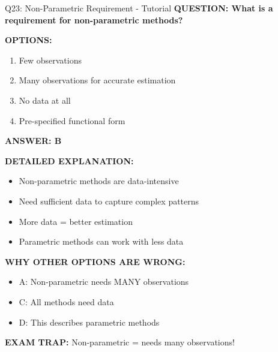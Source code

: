 \documentclass[8pt]{beamer}
\begin{document}
	\begin{frame}{Q23: Non-Parametric Requirement - Tutorial}
		\fontsize{6.5}{7.5}\selectfont
		\textbf{QUESTION: What is a requirement for non-parametric methods?}
		
		\vspace{0.1cm}
		\textbf{OPTIONS:}
		\begin{enumerate}
			\item Few observations
			\item Many observations for accurate estimation
			\item No data at all
			\item Pre-specified functional form
		\end{enumerate}
		
		\vspace{0.1cm}
		\textcolor{myblue}{\textbf{ANSWER: B}}
		
		\vspace{0.1cm}
		\textbf{DETAILED EXPLANATION:}
		\begin{itemize}
			\item Non-parametric methods are data-intensive
			\item Need sufficient data to capture complex patterns
			\item More data = better estimation
			\item Parametric methods can work with less data
		\end{itemize}
		
		\vspace{0.1cm}
		\textcolor{myred}{\textbf{WHY OTHER OPTIONS ARE WRONG:}}
		\begin{itemize}
			\item \textcolor{myred}{A:} Non-parametric needs MANY observations
			\item \textcolor{myred}{C:} All methods need data
			\item \textcolor{myred}{D:} This describes parametric methods
		\end{itemize}
		
		\textcolor{myred}{\textbf{EXAM TRAP:}} Non-parametric = \textcolor{myblue}{needs many observations}!
	\end{frame}
	
\end{document}

